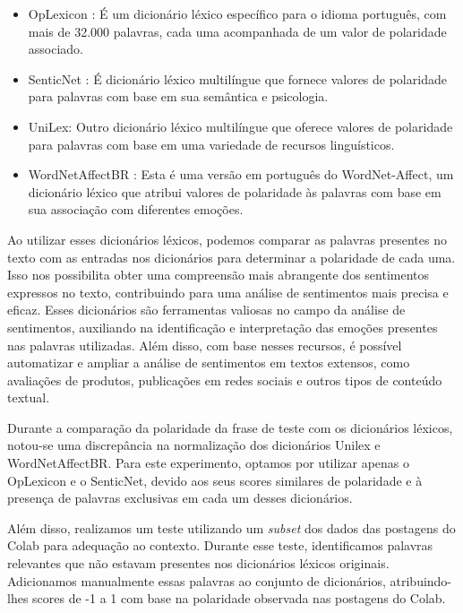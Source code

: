 \begin{itemize}
	\item OpLexicon \cite{2011_Souza_IP}: É um dicionário léxico específico para o idioma português, com mais de 32.000 palavras, cada uma acompanhada de um valor de polaridade associado.
	\item SenticNet \cite{2016_Cambria_IP}: É dicionário léxico multilíngue que fornece valores de polaridade para palavras com base em sua semântica e psicologia.
	\item UniLex: Outro dicionário léxico multilíngue que oferece valores de polaridade para palavras com base em uma variedade de recursos linguísticos.
	\item WordNetAffectBR \cite{2008_Pasqualotti}: Esta é uma versão em português do WordNet-Affect, um dicionário léxico que atribui valores de polaridade às palavras com base em sua associação com diferentes emoções.
\end{itemize}

Ao utilizar esses dicionários léxicos, podemos comparar as palavras presentes no texto com as entradas nos dicionários para determinar a polaridade de cada uma. Isso nos possibilita obter uma compreensão mais abrangente dos sentimentos expressos no texto, contribuindo para uma análise de sentimentos mais precisa e eficaz. Esses dicionários são ferramentas valiosas no campo da análise de sentimentos, auxiliando na identificação e interpretação das emoções presentes nas palavras utilizadas. Além disso, com base nesses recursos, é possível automatizar e ampliar a análise de sentimentos em textos extensos, como avaliações de produtos, publicações em redes sociais e outros tipos de conteúdo textual.

Durante a comparação da polaridade da frase de teste com os dicionários léxicos, notou-se uma discrepância na normalização dos dicionários Unilex e WordNetAffectBR. Para este experimento, optamos por utilizar apenas o OpLexicon e o SenticNet, devido aos seus scores similares de polaridade e à presença de palavras exclusivas em cada um desses dicionários.

Além disso, realizamos um teste utilizando um \textit{subset} dos dados das postagens do Colab para adequação ao contexto. Durante esse teste, identificamos palavras relevantes que não estavam presentes nos dicionários léxicos originais. Adicionamos manualmente essas palavras ao conjunto de dicionários, atribuindo-lhes scores de -1 a 1 com base na polaridade observada nas postagens do Colab.

